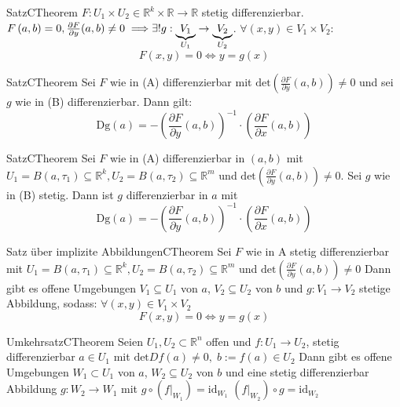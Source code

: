 \documentclass[a4paper]{memoir}
\begin{document}
\begin{ibox}[46]{Satz}{CTheorem}
    $ F: U_1 \times U_2 \in \mathbb{R}^{k} \times \mathbb{R}  \to \mathbb{R}  $ stetig differenzierbar. $ F \left( a,b \right) = 0, 
		\frac{\partial F}{\partial y} (a,b) \neq 0 \implies\\  \exists! g: \underbrace{V_1}_{U_1} \to \underbrace{V_2}_{U_2}$. 
		$ \forall (x,y) \in V_1 \times V_2$:
		$$ F (x,y) = 0 \iff y = g (x)  $$
\end{ibox}
\begin{ibox}[47]{Satz}{CTheorem}
	Sei $ F  $ wie in (A) differenzierbar mit $ \text{det} \left( \frac{\partial F}{\partial y } (a,b) \right) \neq 0 $ und sei $ g $  
	wie in (B) differenzierbar. Dann gilt:
	$$
	\text{Dg} (a) = - \left( \frac{\partial F}{\partial y} (a,b)  \right)^{-1} \cdot \left( \frac{\partial F}{\partial x} (a,b)  \right) 
	$$
\end{ibox}
\begin{ibox}[45]{Satz}{CTheorem}
	Sei $ F $ wie in (A) differenzierbar in $ (a,b)  $ mit $ U_1 = B (a, \tau_1) \subseteq \mathbb{R}^{k}, U_2 = B (a, \tau_2) \subseteq \mathbb{R}^{m} $ und $ \text{det} \left( \frac{\partial F}{\partial y} (a,b)  \right) \neq 0 $. Sei $ g $ wie in (B) stetig. Dann ist 
	$ g $ differenzierbar in $ a $ mit 
	$$ \text{Dg} (a) = - \left( \frac{\partial F}{\partial y} (a,b)  \right) ^{-1} \cdot \left( \frac{\partial F}{\partial x}(a,b)\right)$$
\end{ibox}
\begin{ibox}[49]{Satz über implizite Abbildungen}{CTheorem}
    Sei $ F $ wie in A stetig differenzierbar mit $  U_1 = B (a, \tau_1) \subseteq \mathbb{R}^{k}, U_2 = B (a, \tau_2) 
		\subseteq \mathbb{R}^{m} $ und $ \text{det} \left( \frac{\partial F}{\partial y } (a,b)  \right) \neq 0  $  
		Dann gibt es offene Umgebungen $ V_1 \subseteq U_1 $ von $ a $, $ V_2 \subseteq U_2 $ von $ b $ und $ g: V_1 \to V_2 $ stetige 
		Abbildung, sodass: $ \forall (x,y) \in V_1 \times V_2 $ 
		$$ F (x,y) = 0 \iff y = g (x)  $$
\end{ibox}
\begin{ibox}[50]{Umkehrsatz}{CTheorem}
	Seien $ U_1, U_2 \subset \mathbb{R}^n $ offen und $ f : U_1 \to U_2$, stetig differenzierbar $ a \in U_1 $ mit $ \text{det} Df (a) 
	\neq 0, \; b := f (a) \in U_2 $ Dann gibt es offene Umgebungen $ W_1 \subset U_1 $ von $ a $, $ W_2 \subseteq U_2 $ von $ b $ 
	und eine stetig differenzierbar Abbildung $ g: W_2 \to W_1 $ mit $ g \circ \left( f | _{W_1} \right) = \text{id}_{W_1}  $ 
 $  \left( f | _{W_2} \right) \circ g = \text{id}_{W_2} $ 
\end{ibox}
\end{document}
